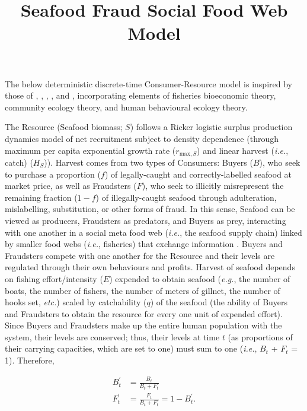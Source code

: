 \documentclass[12pt]{article}
\makeatletter
\renewcommand{\maketitle}{\bgroup\setlength{\parindent}{0pt}
\begin{flushleft}
\textbf{\@title}

  \@author
\end{flushleft}\egroup
}
\makeatother
\begin{document}
\title{Seafood Fraud Social Food Web Model}

\maketitle

The below deterministic discrete-time Consumer-Resource model is inspired by those of \citet{fryxell2010resource}, \citet{mccann2016food}, \citet{fryxell2017supply}, \citet{bieg2017dynamical}, and \citet{bieg2023fisheries}, incorporating elements of fisheries bioeconomic theory, community ecology theory, and human behavioural ecology theory. 

The Resource (Seafood biomass; $S$) follows a Ricker logistic surplus production dynamics model of net recruitment subject to density dependence (through maximum per capita exponential growth rate ($r_{\mathrm{max}, S}$) and linear harvest (\textit{i.e.}, catch) ($H_S$)). Harvest comes from two types of Consumers: Buyers ($B$), who seek to purchase a proportion ($f$) of legally-caught and correctly-labelled seafood at market price, as well as Fraudsters ($F$), who seek to illicitly misrepresent the remaining fraction ($1 - f$) of illegally-caught seafood through adulteration, mislabelling, substitution, or other forms of fraud. In this sense, Seafood can be viewed as producers, Fraudsters as predators, and Buyers as prey, interacting with one another in a social meta food web (\textit{i.e.}, the seafood supply chain) \citep{bieg2022replicating} linked by smaller food webs (\textit{i.e.}, fisheries) that exchange information \citep{bieg2018linking}.  Buyers and Fraudsters compete with one another for the Resource and their levels are regulated through their own behaviours and profits. Harvest of seafood depends on fishing effort/intensity ($E$) expended to obtain seafood (\textit{e.g.}, the number of boats, the number of fishers, the number of meters of gillnet, the number of hooks set, \textit{etc.}) scaled by catchability ($q$) of the seafood (the ability of Buyers and Fraudsters to obtain the resource for every one unit of expended effort). Since Buyers and Fraudsters make up the entire human population with the system, their levels are conserved; thus, their levels at time $t$ (as proportions of their carrying capacities, which are set to one) must sum to one (\textit{i.e.}, $B_t$ + $F_t$ = 1). Therefore,

\begin{align}
B^{'}_{t} &= \frac{B_{t}}{B_{t} + F_{t}} \\
F^{'}_{t} &= \frac{F_{t}}{B_{t} + F_{t}} = 1 - B^{'}_{t}.
\end{align}
\end{document}
